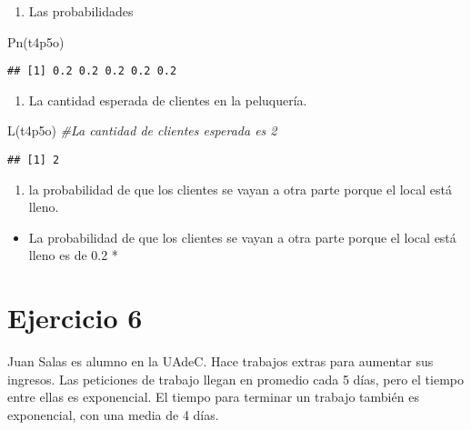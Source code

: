 \documentclass[
]{article}
\newenvironment{Shaded}{\begin{snugshade}}{\end{snugshade}}
\newcommand{\CommentTok}[1]{\textcolor[rgb]{0.56,0.35,0.01}{\textit{#1}}}
\newcommand{\FunctionTok}[1]{\textcolor[rgb]{0.00,0.00,0.00}{#1}}
\newcommand{\NormalTok}[1]{#1}
\providecommand{\tightlist}{%
  \setlength{\itemsep}{0pt}\setlength{\parskip}{0pt}}
\begin{document}
\begin{enumerate}
\def\labelenumi{\alph{enumi})}
\tightlist
\item
  Las probabilidades
\end{enumerate}

\begin{Shaded}
\begin{Highlighting}[]
\FunctionTok{Pn}\NormalTok{(t4p5o)}
\end{Highlighting}
\end{Shaded}

\begin{verbatim}
## [1] 0.2 0.2 0.2 0.2 0.2
\end{verbatim}

\begin{enumerate}
\def\labelenumi{\alph{enumi})}
\setcounter{enumi}{1}
\tightlist
\item
  La cantidad esperada de clientes en la peluquería.
\end{enumerate}

\begin{Shaded}
\begin{Highlighting}[]
\FunctionTok{L}\NormalTok{(t4p5o) }\CommentTok{\#La cantidad de clientes esperada es 2}
\end{Highlighting}
\end{Shaded}

\begin{verbatim}
## [1] 2
\end{verbatim}

\begin{enumerate}
\def\labelenumi{\alph{enumi})}
\setcounter{enumi}{2}
\tightlist
\item
  la probabilidad de que los clientes se vayan a otra parte porque el
  local está lleno.
\end{enumerate}

\begin{itemize}
\tightlist
\item
  La probabilidad de que los clientes se vayan a otra parte porque el
  local está lleno es de 0.2 *
\end{itemize}

\hypertarget{ejercicio-6}{%
\section{Ejercicio 6}\label{ejercicio-6}}

Juan Salas es alumno en la UAdeC. Hace trabajos extras para aumentar sus
ingresos. Las peticiones de trabajo llegan en promedio cada 5 días, pero
el tiempo entre ellas es exponencial. El tiempo para terminar un trabajo
también es exponencial, con una media de 4 días.
\end{document}
